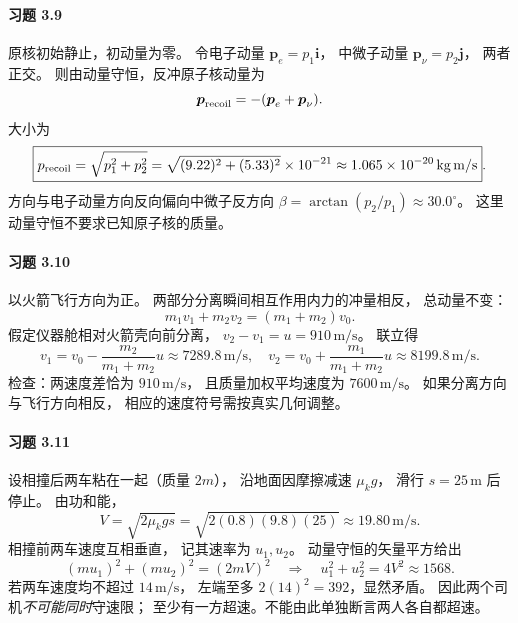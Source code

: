 \paragraph{习题 3.9}
原核初始静止，初动量为零。
令电子动量 \(\boldsymbol p_e=p_1\boldsymbol i\)，
中微子动量 \(\boldsymbol p_\nu=p_2\boldsymbol j\)，
两者正交。
则由动量守恒，反冲原子核动量为
\[
 \boldsymbol p_{\rm recoil}=-
 (\boldsymbol p_e+\boldsymbol p_\nu).
\]
大小为
\[
 \boxed{p_{\rm recoil}
 =\sqrt{p_1^2+p_2^2}
 =\sqrt{(9.22)^2+(5.33)^2}\times10^{-21}
 \approx1.065\times10^{-20}\,\mathrm{kg\,m/s}}.
\]
方向与电子动量方向反向偏向中微子反方向
\(\beta=\arctan(p_2/p_1)\approx30.0^\circ\)。
这里动量守恒不要求已知原子核的质量。

\paragraph{习题 3.10}
以火箭飞行方向为正。
两部分分离瞬间相互作用内力的冲量相反，
总动量不变：
\[
 m_1v_1+m_2v_2=(m_1+m_2)v_0.
\]
假定仪器舱相对火箭壳向前分离，
\(v_2-v_1=u=910\,\mathrm{m/s}\)。
联立得
\[
 \boxed{v_1=v_0-\frac{m_2}{m_1+m_2}u
 \approx7289.8\,\mathrm{m/s}},
\quad
 \boxed{v_2=v_0+\frac{m_1}{m_1+m_2}u
 \approx8199.8\,\mathrm{m/s}}.
\]
检查：两速度差恰为 \(910\,\mathrm{m/s}\)，
且质量加权平均速度为 \(7600\,\mathrm{m/s}\)。
如果分离方向与飞行方向相反，
相应的速度符号需按真实几何调整。

\paragraph{习题 3.11}
设相撞后两车粘在一起（质量 \(2m\)），
沿地面因摩擦减速 \(\mu_kg\)，
滑行 \(s=25\,\mathrm m\) 后停止。
由功和能，
\[
 V=\sqrt{2\mu_kgs}
 =\sqrt{2(0.8)(9.8)(25)}
 \approx19.80\,\mathrm{m/s}.
\]
相撞前两车速度互相垂直，
记其速率为 \(u_1,u_2\)。
动量守恒的矢量平方给出
\[
 (m u_1)^2+(m u_2)^2=(2mV)^2
 \quad\Rightarrow\quad
 \boxed{u_1^2+u_2^2=4V^2\approx1568}.
\]
若两车速度均不超过 \(14\,\mathrm{m/s}\)，
左端至多 \(2(14)^2=392\)，显然矛盾。
因此两个司机\emph{不可能同时}守速限；
至少有一方超速。不能由此单独断言两人各自都超速。

